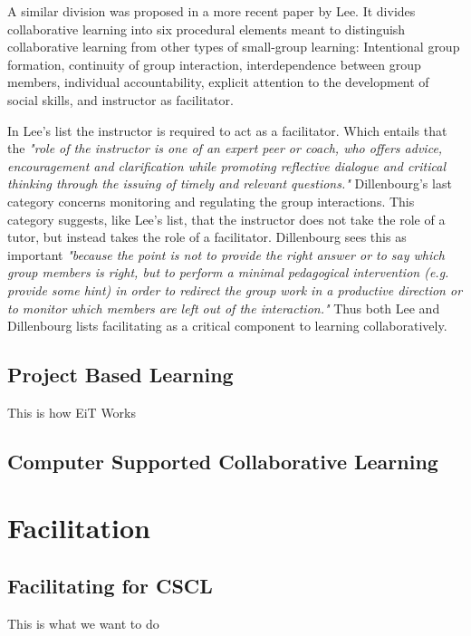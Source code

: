         A similar division was proposed in a more recent paper by Lee. It divides collaborative learning into six procedural elements meant to distinguish collaborative learning from other types of small-group learning: Intentional group formation, continuity of group interaction, interdependence between group members, individual accountability, explicit attention to the development of social skills, and instructor as facilitator. \cite{Lee2009}
        
        In Lee's list the instructor is required to act as a facilitator. Which entails that the \emph{"role of the instructor is one of an expert peer or coach, who offers advice, encouragement and clarification while promoting reflective dialogue and critical thinking through the issuing of timely and relevant questions."} \cite{Lee2009} Dillenbourg's last category concerns monitoring and regulating the group interactions. This category suggests, like Lee's list, that the instructor does not take the role of a tutor, but instead takes the role of a facilitator. Dillenbourg sees this as important \emph{"because the point is not to provide the right answer or to say which group members is right, but to perform a minimal pedagogical intervention (e.g. provide some hint) in order to redirect the group work in a productive direction or to monitor which members are left out of the interaction."} \cite{dillenbourg1999} Thus both Lee and Dillenbourg lists facilitating as a critical component to learning collaboratively.
        
        \subsection{Project Based Learning}
        This is how EiT Works
        
        \subsection{Computer Supported Collaborative Learning}
    
    \section{Facilitation}
        \subsection{Facilitating for CSCL}
        This is what we want to do